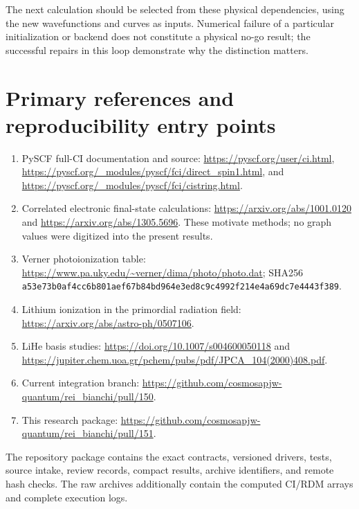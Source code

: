 \documentclass[
  10pt,
]{article}
\providecommand{\tightlist}{%
  \setlength{\itemsep}{0pt}\setlength{\parskip}{0pt}}
\begin{document}
The next calculation should be selected from these physical
dependencies, using the new wavefunctions and curves as inputs.
Numerical failure of a particular initialization or backend does not
constitute a physical no-go result; the successful repairs in this loop
demonstrate why the distinction matters.

\hypertarget{primary-references-and-reproducibility-entry-points}{%
\section{Primary references and reproducibility entry
points}\label{primary-references-and-reproducibility-entry-points}}

\begin{enumerate}
\def\labelenumi{\arabic{enumi}.}
\tightlist
\item
  PySCF full-CI documentation and source:
  \url{https://pyscf.org/user/ci.html},
  \url{https://pyscf.org/_modules/pyscf/fci/direct_spin1.html}, and
  \url{https://pyscf.org/_modules/pyscf/fci/cistring.html}.
\item
  Correlated electronic final-state calculations:
  \url{https://arxiv.org/abs/1001.0120} and
  \url{https://arxiv.org/abs/1305.5696}. These motivate methods; no
  graph values were digitized into the present results.
\item
  Verner photoionization table:
  \url{https://www.pa.uky.edu/~verner/dima/photo/photo.dat}; SHA256
  \nolinkurl{a53e73b0af4cc6b801aef67b84bd964e3ed8c9c4992f214e4a69dc7e4443f389}.
\item
  Lithium ionization in the primordial radiation field:
  \url{https://arxiv.org/abs/astro-ph/0507106}.
\item
  LiHe basis studies: \url{https://doi.org/10.1007/s004600050118} and
  \url{https://jupiter.chem.uoa.gr/pchem/pubs/pdf/JPCA_104(2000)408.pdf}.
\item
  Current integration branch:
  \url{https://github.com/cosmosapjw-quantum/rei_bianchi/pull/150}.
\item
  This research package:
  \url{https://github.com/cosmosapjw-quantum/rei_bianchi/pull/151}.
\end{enumerate}

The repository package contains the exact contracts, versioned drivers,
tests, source intake, review records, compact results, archive
identifiers, and remote hash checks. The raw archives additionally
contain the computed CI/RDM arrays and complete execution logs.
\end{document}
